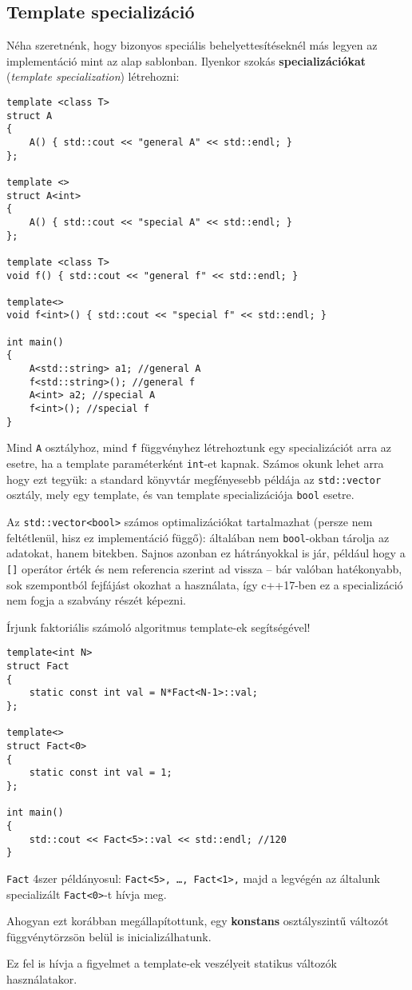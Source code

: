\documentclass[a4paper,11.5pt,table]{article}
\begin{document}
	\subsection{Template specializáció}
	Néha szeretnénk, hogy bizonyos speciális behelyettesítéseknél más legyen az implementáció mint az alap sablonban. Ilyenkor szokás \textbf{specializációkat} (\textit{template specialization}) létrehozni:
	
	\begin{lstlisting}
template <class T>
struct A
{
	A()	{ std::cout << "general A" << std::endl; }
};

template <>
struct A<int>
{
	A() { std::cout << "special A" << std::endl; }
};

template <class T>
void f() { std::cout << "general f" << std::endl; }

template<>
void f<int>() { std::cout << "special f" << std::endl; }

int main() 
{
	A<std::string> a1; //general A
	f<std::string>(); //general f
	A<int> a2; //special A
	f<int>(); //special f
}
	\end{lstlisting}
	Mind \texttt{A} osztályhoz, mind \texttt{f} függvényhez létrehoztunk egy specializációt arra az esetre, ha a template paraméterként \texttt{int}-et kapnak. Számos okunk lehet arra hogy ezt tegyük: a standard könyvtár megfényesebb példája az \texttt{std::vector} osztály, mely egy template, és van template specializációja \texttt{bool} esetre.
	\begin{note}
		Az \texttt{std::vector<bool>} számos optimalizációkat tartalmazhat (persze nem feltétlenül, hisz ez implementáció függő): általában nem \texttt{bool}-okban tárolja az adatokat, hanem bitekben. Sajnos azonban ez hátrányokkal is jár, például hogy a \texttt{[]} operátor érték és nem referencia szerint ad vissza -- bár valóban hatékonyabb, sok szempontból fejfájást okozhat a használata, így c++17-ben ez a specializáció nem fogja a szabvány részét képezni.
	\end{note}
	Írjunk faktoriális számoló algoritmus template-ek segítségével!
	\begin{lstlisting}
template<int N>                           
struct Fact 
{                             
	static const int val = N*Fact<N-1>::val;
};

template<>                                
struct Fact<0>
{                          
	static const int val = 1;               
};               

int main() 
{                                          
	std::cout << Fact<5>::val << std::endl; //120
}
	\end{lstlisting}
	\texttt{Fact} 4szer példányosul: \texttt{Fact<5>, \ldots, Fact<1>,} majd a legvégén az általunk specializált \texttt{Fact<0>}-t hívja meg.
	\begin{note}
		Ahogyan ezt korábban megállapítottunk, egy \textbf{konstans} osztályszintű változót függvénytörzsön belül is inicializálhatunk.
	\end{note}
	Ez fel is hívja a figyelmet a template-ek veszélyeit statikus változók használatakor.
	
\end{document}

